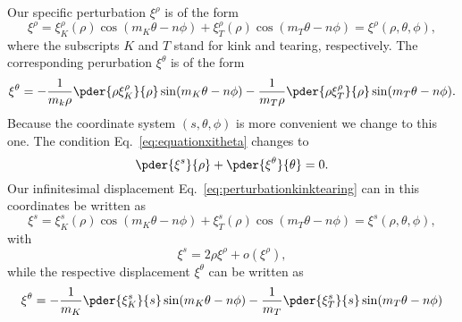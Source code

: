 Our specific perturbation $\xi^{\rho}$ is of the form
\begin{equation}
  \xi^{\rho} = \xi_K^{\rho} (\rho) \cos (m_K \theta - n \phi) + \xi_T^{\rho} (\rho) \cos (m_T \theta - n \phi) = \xi^{\rho} (\rho, \theta, \phi),
  \label{eq:perturbationkinktearing}
\end{equation}
where the subscripts $K$ and $T$ stand for kink and tearing,
respectively.
The corresponding perurbation $\xi^{\theta}$ is of the form
\begin{equation}
  \xi^{\theta} = - \frac{1}{m_k \rho} \pder{\rho \xi_K^{\rho}}{\rho} \sin (m_K \theta - n \phi)
                 - \frac{1}{m_T \rho} \pder{\rho \xi_T^{\rho}}{\rho} \sin (m_T \theta - n \phi).
\end{equation}
Because the coordinate system $(s, \theta, \phi)$ is more convenient we
change to this one.
The condition Eq.~\eqref{eq:equationxitheta} changes to
\begin{equation}
  \pder{\xi^{s}}{\rho} + \pder{\xi^{\theta}}{\theta} = 0.
\end{equation}
Our infinitesimal displacement Eq.~\eqref{eq:perturbationkinktearing}
can in this coordinates be written as
\begin{equation}
  \xi^{s} = \xi_K^{s} (\rho) \cos (m_K \theta - n \phi) + \xi_T^{s} (\rho) \cos (m_T \theta - n \phi) = \xi^{s} (\rho, \theta, \phi),
  \label{eq:infinitesimaldisplacements}
\end{equation}
with
\begin{equation}
  \xi^{s} = 2 \rho \xi^{\rho} + o(\xi^{\rho}),
\end{equation}
while the respective displacement $\xi^{\theta}$ can be written as
\begin{equation}
  \xi^{\theta} = - \frac{1}{m_K}\pder{\xi_K^{s}}{s} \sin (m_K \theta - n \phi) - \frac{1}{m_T}\pder{\xi_T^{s}}{s} \sin (m_T \theta - n \phi)
\end{equation}


